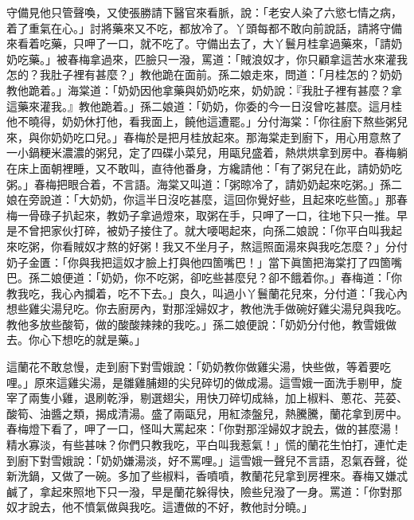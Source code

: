 守備見他只管聲喚，又使張勝請下醫官來看脈，說：「老安人染了六慾七情之病，着了重氣在心。」{}討將藥來又不吃，都放冷了。丫頭每都不敢向前說話，請將守備來看着吃藥，只呷了一口，就不吃了。{}守備出去了，大丫鬟月桂拿過藥來，「請奶奶吃藥。」被春梅拿過來，匹臉只一潑，罵道：「賊浪奴才，你只顧拿這苦水來灌我怎的？我肚子裡有甚麼？」教他跪在面前。孫二娘走來，問道：「月桂怎的？奶奶教他跪着。」海棠道：「奶奶因他拿藥與奶奶吃來，奶奶說：『我肚子裡有甚麼？拿這藥來灌我。』教他跪着。」孫二娘道：「奶奶，你委的今一日沒曾吃甚麼。這月桂他不曉得，奶奶休打他，看我面上，饒他這遭罷。」分付海棠：「你往廚下熬些粥兒來，與你奶奶吃口兒。」春梅於是把月桂放起來。那海棠走到廚下，用心用意熬了一小鍋粳米濃濃的粥兒，定了四碟小菜兒，用甌兒盛着，熱烘烘拿到房中。春梅躺在床上面朝裡睡，又不敢叫，直待他番身，方纔請他：「有了粥兒在此，請奶奶吃粥。」春梅把眼合着，不言語。海棠又叫道：「粥晾冷了，請奶奶起來吃粥。」孫二娘在旁說道：「大奶奶，你這半日沒吃甚麼，這回你覺好些，且起來吃些箇。」那春梅一骨碌子扒起來，教奶子拿過燈來，取粥在手，只呷了一口，往地下只一推。{}早是不曾把家伙打碎，被奶子接住了。就大喓喝起來，向孫二娘說：「你平白叫我起來吃粥，你看賊奴才熬的好粥！我又不坐月子，熬這照面湯來與我吃怎麼？」分付奶子金匱：「你與我把這奴才臉上打與他四箇嘴巴！」當下眞箇把海棠打了四箇嘴巴。孫二娘便道：「奶奶，你不吃粥，卻吃些甚麼兒？卻不餓着你。」春梅道：「你教我吃，我心內攔着，吃不下去。」良久，叫過小丫鬟蘭花兒來，分付道：「我心內想些雞尖湯兒吃。{}你去廚房內，對那淫婦奴才，教他洗手做碗好雞尖湯兒與我吃。教他多放些酸筍，做的酸酸辣辣的我吃。」{}孫二娘便說：「奶奶分付他，教雪娥做去。你心下想吃的就是藥。」

這蘭花不敢怠慢，走到廚下對雪娥說：「奶奶教你做雞尖湯，快些做，等着要吃哩。」{}原來這雞尖湯，是雛雞脯翅的尖兒碎切的做成湯。這雪娥一面洗手剔甲，旋宰了兩隻小雞，退刷乾淨，剔選翅尖，用快刀碎切成絲，加上椒料、蔥花、芫荽、酸筍、油醬之類，揭成清湯。盛了兩甌兒，用紅漆盤兒，熱騰騰，蘭花拿到房中。春梅燈下看了，呷了一口，怪叫大罵起來：「你對那淫婦奴才說去，做的甚麼湯！精水寡淡，有些甚味？你們只教我吃，平白叫我惹氣！」慌的蘭花生怕打，連忙走到廚下對雪娥說：「奶奶嫌湯淡，好不罵哩。」這雪娥一聲兒不言語，忍氣吞聲，從新洗鍋，又做了一碗。多加了些椒料，香噴噴，教蘭花兒拿到房裡來。春梅又嫌忒鹹了，拿起來照地下只一潑，早是蘭花躲得快，險些兒潑了一身。罵道：「你對那奴才說去，他不憤氣做與我吃。這遭做的不好，教他討分曉。」{}

